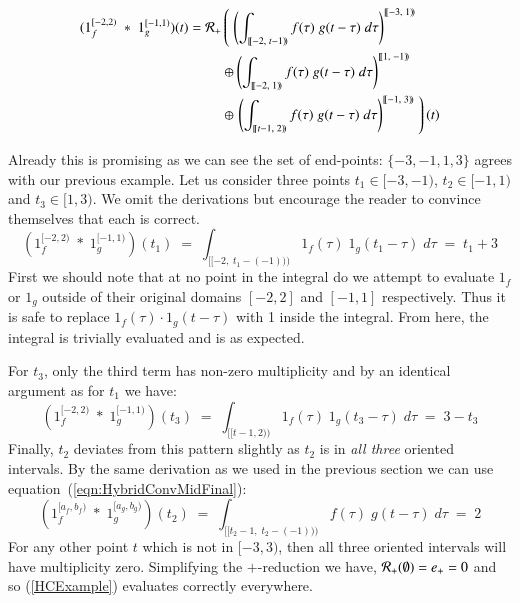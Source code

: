 \begin{align}
	\label{HCExample}
	(1_f^{[-2,2)} \;*\; 1_g^{[-1,1)}) (t) = 
		\R[+] &\left( \; \left( 
			\int_{[\![-2,\;t-1)\!)} f(\tau) \; g(t-\tau) \; d\tau \right)^{[\![-3,\; 1)\!)} 
				\right. \notag \\ &\oplus \left( 
			\int_{[\![-2,\;1)\!)} f(\tau) \; g(t-\tau) \; d\tau \right)^{[\![1,\; -1)\!)} 
				\notag \\ &\oplus \left. \left( 
			\int_{[\![t-1,\;2)\!)} f(\tau) \; g(t-\tau) \; d\tau \right)^{[\![-1,\; 3)\!)} 
				\; \right)(t)
\end{align}




Already this is promising as we can see the set of end-points: $\{-3, -1, 1, 3\}$ agrees with our previous example.
Let us consider three points $t_1 \in [-3, -1)$, $t_2 \in [-1, 1)$ and $t_3 \in [1,3)$.
We omit the derivations but encourage the reader to convince themselves that each is correct.
\begin{equation*}
	(1_f^{[-2,2)} \;*\; 1_g^{[-1,1)}) (t_1) 
		\;=\; \int_{[\![-2,\;t_1-(-1))\!)} 1_f(\tau) \; 1_g(t_1-\tau) \; d\tau
		\;=\; t_1 + 3
\end{equation*}
First we should note that at no point in the integral do we attempt to evaluate $1_f$ or $1_g$ outside of their original 
domains $[-2,2]$ and $[-1,1]$ respectively. 
Thus it is safe to replace $1_f(\tau)\cdot 1_g(t-\tau)$ with 1  inside the integral.
From here, the integral is trivially evaluated and is as expected.


For $t_3$, only the third term has non-zero multiplicity and by an identical argument as for $t_1$ we have:
\begin{equation*}
	(1_f^{[-2,2)} \;*\; 1_g^{[-1,1)}) (t_3) 
		\;=\; \int_{[\![t-1,2)\!)} 1_f(\tau) \; 1_g(t_3-\tau) \; d\tau
		\;=\; 3 - t_3
\end{equation*}
Finally, $t_2$ deviates from this pattern slightly as $t_2$ is in \emph{all three} oriented intervals.
By the same derivation as we used in the previous section we can use equation~(\ref{eqn:HybridConvMidFinal}):
\begin{equation*}
	\label{eqn:HCExampleT2}
	(1_f^{[a_f,b_f)} \;*\; 1_g^{[a_g,b_g)}) (t_2) 
		\;=\; \int_{[\![t_2-1,\;t_2-(-1))\!)} f(\tau) \; g(t-\tau) \; d\tau
		\;=\; 2
\end{equation*}
For any other point $t$ which is not in $[-3, 3)$, then all three oriented intervals will have multiplicity zero.
Simplifying the $+$-reduction we have, $\R[+](\emptyset) = e_+ = 0$ and so (\ref{HCExample}) evaluates correctly 
everywhere.

